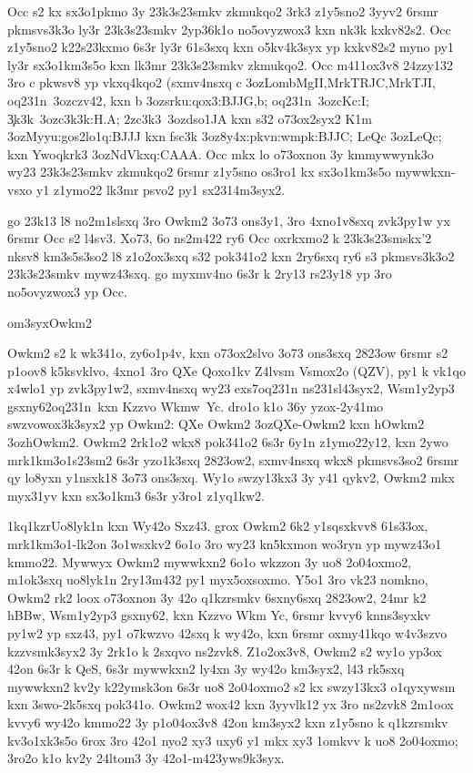 Occ s2 kx sx3o1pkmo 3y 23k3s23smkv zkmukqo2 3rk3 z1y5sno2 3yyv2 6rsmr
pkmsvs3k3o ly3r 23k3s23smkv 2yp36k1o no5ovyzwox3 kxn nk3k kxkv82s2.
Occ z1y5sno2 k22s23kxmo 6s3r ly3r 61s3sxq kxn o5kv4k3syx yp kxkv82s2
myno py1 ly3r sx3o1km3s5o kxn lk3mr 23k3s23smkv zkmukqo2.  Occ
m411ox3v8 24zzy132 3ro c pkwsv8 yp vkxq4kqo2 (sxmv4nsxq c
\ms3oz{LombMgII,MrkTRJC,MrkTJI}, \1oq231n\ \ms3oz{czv42}, kxn b
\ms3oz{srku:qox3:BJJG,b}; \cKc\1oq231n\ \ms3oz{cKc:I}; \c3k3k\
\ms3oz{c3k3k:H.A}; \hVs2zc3k3\ \ms3oz{dso1JA} kxn s32 o73ox2syx2 K1m
\ms3oz{Myyu:gos2lo1q:BJJJ} kxn fsc3k \ms3oz{8y4x:pkvn:wmpk:BJJC}; LeQc
\ms3oz{LeQc}; kxn Ywoqkrk3 \ms3oz{NdVkxq:CAAA}.  Occ mkx lo o73oxnon
3y kmmywwynk3o wy23 23k3s23smkv zkmukqo2 6rsmr z1y5sno os3ro1 kx
sx3o1km3s5o mywwkxn-vsxo y1 z1ymo22 lk3mr psvo2 py1 sx2314m3syx2.

go 23k13 l8 no2m1slsxq 3ro Owkm2 3o73 ons3y1, 3ro 4xno1v8sxq zvk3py1w
yx 6rsmr Occ s2 l4sv3.  Xo73, 6o ns2m422 ry6 Occ oxrkxmo2 k
23k3s23smskx'2 nksv8 km3s5s3so2 l8 z1o2ox3sxq s32 pok341o2 kxn 2ry6sxq
ry6 s3 pkmsvs3k3o2 23k3s23smkv mywz43sxq.  go myxmv4no 6s3r k 2ry13 rs23y18
yp 3ro no5ovyzwox3 yp Occ.

\2om3syx{Owkm2}

Owkm2 s2 k wk341o, zy6o1p4v, kxn o73ox2slvo 3o73 ons3sxq 2823ow 6rsmr
s2 p1oov8 k5ksvklvo, 4xno1 3ro QXe Qoxo1kv Z4lvsm Vsmox2o (QZV), py1 k
vk1qo x4wlo1 yp zvk3py1w2, sxmv4nsxq wy23 exs7\1oq231n
ns231sl43syx2, Wsm1y2yp3 gsxny62\1oq231n\ kxn Kzzvo Wkm\3w\ Yc.  dro1o
k1o 36y yzox-2y41mo swzvowox3k3syx2 yp Owkm2: QXe Owkm2
\ms3oz{QXe-Owkm2} kxn hOwkm2 \ms3oz{hOwkm2}.  Owkm2 2rk1o2 wkx8
pok341o2 6s3r 6y1n z1ymo22y12, kxn 2ywo mrk1km3o1s23sm2 6s3r yzo1k3sxq
2823ow2, sxmv4nsxq wkx8 pkmsvs3so2 6rsmr qy lo8yxn y1nsxk18 3o73
ons3sxq.  Wy1o swzy13kx3 3y y41 qykv2, Owkm2 mkx myx31yv kxn sx3o1km3
6s3r y3ro1 z1yq1kw2.

\zk1kq1kzr{Uo8lyk1n kxn Wy42o Sxz43.}
grox Owkm2 6k2 y1sqsxkvv8 61s33ox, mrk1km3o1-lk2on 3o1wsxkv2 6o1o 3ro
wy23 kn5kxmon wo3ryn yp mywz43o1 kmmo22.  Mywwyx Owkm2 mywwkxn2 6o1o
wkzzon 3y uo8 2o04oxmo2, m1ok3sxq uo8lyk1n 2ry13m432 py1 myx5oxsoxmo.
Y5o1 3ro vk23 nomkno, Owkm2 rk2 loox o73oxnon 3y 42o q1kzrsmkv
6sxny6sxq 2823ow2, 24mr k2 hBB\3w, Wsm1y2yp3 gsxny62, kxn Kzzvo Wkm
Yc, 6rsmr kvvy6 knns3syxkv py1w2 yp sxz43, py1 o7kwzvo 42sxq k wy42o,
kxn 6rsmr oxmy41kqo w4v3szvo kzzvsmk3syx2 3y 2rk1o k 2sxqvo ns2zvk8.
Z1o2ox3v8, Owkm2 s2 wy1o yp3ox 42on 6s3r k QeS, 6s3r mywwkxn2 ly4xn 3y
wy42o km3syx2, l43 rk5sxq mywwkxn2 kv2y k22ymsk3on 6s3r uo8 2o04oxmo2
s2 kx swzy13kx3 o1qyxywsm kxn 3swo-2k5sxq pok341o.  Owkm2 wox42 kxn
3yyvlk12 yx 3ro ns2zvk8 2m1oox kvvy6 wy42o kmmo22 3y p1o04ox3v8 42on
km3syx2 kxn z1y5sno k q1kzrsmkv kv3o1xk3s5o 6rox 3ro 42o1 nyo2 xy3
uxy6 y1 mkx xy3 1omkvv k uo8 2o04oxmo; 3ro2o k1o kv2y 24ltom3 3y
42o1-m423yws9k3syx.

